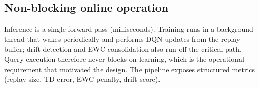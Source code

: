 \subsection{Non-blocking online operation}
Inference is a single forward pass (milliseconds). Training runs in a background
thread that wakes periodically and performs DQN updates from the replay buffer;
drift detection and EWC consolidation also run off the critical path. Query
execution therefore never blocks on learning, which is the operational
requirement that motivated the design. The pipeline exposes structured metrics
(replay size, TD error, EWC penalty, drift score).
